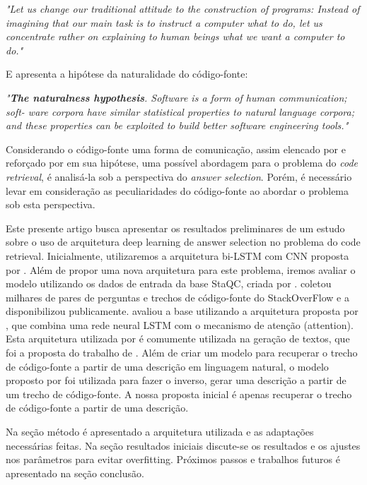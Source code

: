 \documentclass[12pt]{article}
\begin{document}
\textit{"Let us change our traditional attitude to the construction of programs: Instead of imagining that our
main task is to instruct a computer what to do, let us
concentrate rather on explaining to human beings what
we want a computer to do."}

E \cite{Allamanis:2018:SML} apresenta a hipótese da naturalidade do código-fonte:

\textit{"\textbf{The naturalness hypothesis}. Software is a form of human communication; soft-
ware corpora have similar statistical properties to natural language corpora; and these
properties can be exploited to build better software engineering tools."}

Considerando o código-fonte uma forma de comunicação, assim elencado por \cite{Knuth:1984:LP} e reforçado por \cite{Allamanis:2018:SML} em sua hipótese, uma possível abordagem para o problema 
do \textit{code retrieval}, é analisá-la sob a perspectiva do \textit{answer selection}. Porém, é necessário levar em consideração as peculiaridades do código-fonte ao abordar o problema sob esta perspectiva. 

Este presente artigo busca apresentar os resultados preliminares de um estudo sobre o uso de arquitetura deep learning de answer selection no problema do code retrieval.
Inicialmente, utilizaremos a arquitetura bi-LSTM com CNN proposta por \cite{tan-lstm-qa}. Além de propor uma nova arquitetura para este problema, iremos avaliar o modelo 
utilizando os dados de entrada da base StaQC, criada por \cite{Yao-staqc:2018}. \cite{Yao-staqc:2018} coletou milhares de pares de perguntas e trechos de código-fonte do StackOverFlow e a 
disponibilizou publicamente. \cite{Yao-staqc:2018} avaliou a base utilizando a arquitetura proposta por \cite{iyer-etal-2016-summarizing}, que combina uma rede neural LSTM com o mecanismo 
de atenção (attention). Esta arquitetura utilizada por \cite{iyer-etal-2016-summarizing} é comumente utilizada na geração de textos, que foi a proposta do trabalho de \cite{iyer-etal-2016-summarizing}. Além de criar um modelo
para recuperar o trecho de código-fonte a partir de uma descrição em linguagem natural, o modelo proposto por \cite{iyer-etal-2016-summarizing} foi utilizada para fazer o inverso, gerar uma descrição
a partir de um trecho de código-fonte. A nossa proposta inicial é apenas recuperar o trecho de código-fonte a partir de uma descrição.

Na seção método é apresentado a arquitetura utilizada e as adaptações necessárias feitas. Na seção resultados iniciais discute-se os resultados e os ajustes nos 
parâmetros para evitar overfitting. Próximos passos e trabalhos futuros é apresentado na seção conclusão.
\end{document}
